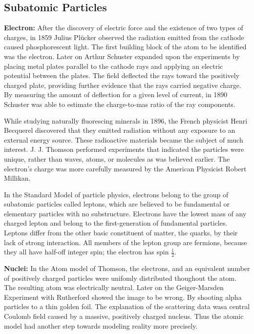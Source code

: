 \documentclass[10pt,a4paper]{article}
\begin{document}
\subsection{Subatomic Particles}
\textbf{Electron:}  After the discovery of electric force and the existence of two types of charges, in 1859 Julius Plücker observed the radiation emitted from the cathode caused phosphorescent light. The first building block of the atom to be identified was the electron. Later on Arthur Schuster expanded upon the experiments by placing metal plates parallel to the cathode rays and applying an electric potential between the plates. The field deflected the rays toward the positively charged plate, providing further evidence that the rays carried negative charge. By measuring the amount of deflection for a given level of current, in 1890 Schuster was able to estimate the charge-to-mas ratio of the ray components.

While studying naturally fluorescing minerals in 1896, the French physicist Henri Becquerel discovered that they emitted radiation without any exposure to an external energy source. These radioactive materials became the subject of much interest. J. J. Thomson performed experiments that indicated the particles were unique, rather than waves, atoms, or molecules as was believed earlier. The electron's charge was more carefully measured by the American Physicist Robert Millikan.

In the Standard Model of particle physics, electrons belong to the group of subatomic particles called leptons, which are believed to be fundamental or elementary particles with no substructure. Electrons have the lowest mass of any charged lepton and belong to the first-generation of fundamental particles. Leptons differ from the other basic constituent of matter, the quarks, by their lack of strong interaction. All members of the lepton group are fermions, because they all have half-off integer spin; the electron has spin $\frac12$.

\textbf{Nuclei:} In the Atom model of Thomson, the electrons, and an equivalent number of positively charged particles were unifomly distributed thoughout the atom. The resulting atom was electrically neutral. Later on the Geiger-Marsden Experiment with Rutherford showed the image to be wrong. By shooting alpha particles to a thin golden foil. The explanation of the scattering data wasa  central Coulomb field caused by a massive, positively charged nucleus. Thus the atomic model had another step towards modeling reality more precisely.
\end{document}
